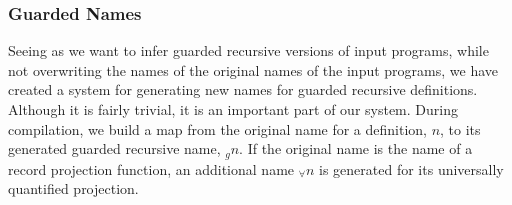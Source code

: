 
 


  
  

\subsubsection{Guarded Names}
Seeing as we want to infer guarded recursive versions of input programs, while not
overwriting the names of the original names of the input programs, we have created a system for
generating new names for guarded recursive definitions. Although it is fairly
trivial, it is an important part of our system. During compilation, we build a
map from the original name for a definition, $n$, to its generated guarded recursive name,
$_gn$. If the original name is the name of a record projection function, an
additional name $_{\forall}n$ is generated for its universally quantified
projection. 

